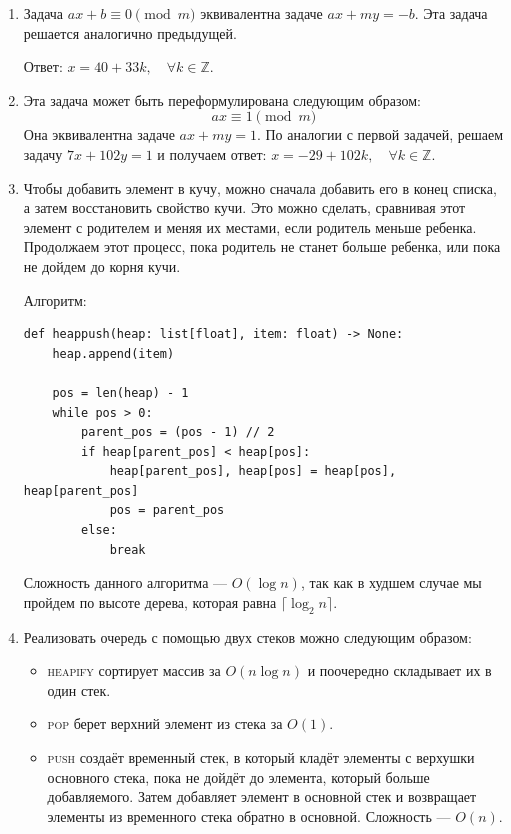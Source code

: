 \documentclass{article}
\begin{document}
\begin{enumerate}
	\item Задача $ax + b \equiv 0 \pmod m$ эквивалентна
	      задаче $ax + my = -b$.
	      Эта задача решается аналогично предыдущей.

	      Ответ: $x = 40 + 33k, \quad \forall k \in \mathbb{Z}$.

	\item Эта задача может быть переформулирована следующим
	      образом:
	      \[
		      ax \equiv 1 \pmod m
	      \]
	      Она эквивалентна задаче $ax + my = 1$.
	      По аналогии с
	      первой задачей, решаем задачу
	      $7x + 102y = 1$ и получаем ответ:
	      $x = -29 + 102k, \quad \forall k \in \mathbb{Z}$.

	\item
	      Чтобы добавить элемент в кучу, можно сначала
	      добавить его в конец списка, а затем восстановить
	      свойство кучи. Это можно сделать, сравнивая
	      этот элемент с родителем и меняя их местами,
	      если родитель меньше ребенка. Продолжаем этот
	      процесс, пока родитель не станет больше ребенка,
	      или пока не дойдем до корня кучи.

	      Алгоритм:
	      \begin{lstlisting}
def heappush(heap: list[float], item: float) -> None:
    heap.append(item)

    pos = len(heap) - 1
    while pos > 0:
        parent_pos = (pos - 1) // 2
        if heap[parent_pos] < heap[pos]:
            heap[parent_pos], heap[pos] = heap[pos], heap[parent_pos]
            pos = parent_pos
        else:
            break
          \end{lstlisting}

	      Сложность данного алгоритма --- $O(\log n)$, так как
	      в худшем случае мы пройдем по высоте дерева, которая равна
	      $\lceil \log_2 n \rceil$.

	\item Реализовать очередь с помощью двух стеков можно
	      следующим образом:
	      \begin{itemize}
		      \item \textsc{heapify} сортирует массив за $O(n \log n)$
		            и поочередно складывает их в один стек.
		      \item \textsc{pop} берет верхний элемент из стека за $O(1)$.

		      \item \textsc{push} создаёт временный стек, в который
		            кладёт элементы с верхушки основного стека,
		            пока не дойдёт до элемента, который больше
		            добавляемого. Затем добавляет элемент в
		            основной стек и возвращает элементы из
		            временного стека обратно в основной.
		            Сложность --- $O(n)$.


\end{itemize}
\end{enumerate}
\end{document}
